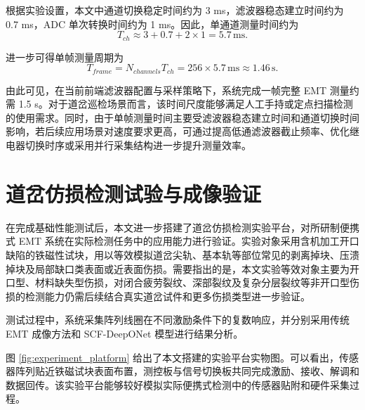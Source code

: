 根据实验设置，本文中通道切换稳定时间约为 3 ms，滤波器稳态建立时间约为 0.7 ms，ADC 单次转换时间约为 1 ms。因此，单通道测量时间约为
\begin{equation}
\label{eq:t_ch_value}
T_{ch}\approx 3+0.7+2\times1=5.7\,\mathrm{ms}.
\end{equation}

进一步可得单帧测量周期为
\begin{equation}
\label{eq:t_frame}
T_{frame}=N_{channels}T_{ch}=256\times5.7\,\mathrm{ms}\approx1.46\,\mathrm{s}.
\end{equation}

由此可见，在当前前端滤波器配置与采样策略下，系统完成一帧完整 EMT 测量约需 1.5 s。对于道岔巡检场景而言，该时间尺度能够满足人工手持或定点扫描检测的使用需求。同时，由于单帧测量时间主要受滤波器稳态建立时间和通道切换时间影响，若后续应用场景对速度要求更高，可通过提高低通滤波器截止频率、优化继电器切换时序或采用并行采集结构进一步提升测量效率。

\section{道岔仿损检测试验与成像验证}

在完成基础性能测试后，本文进一步搭建了道岔仿损检测实验平台，对所研制便携式 EMT 系统在实际检测任务中的应用能力进行验证。实验对象采用含机加工开口缺陷的铁磁性试块，用以等效模拟道岔尖轨、基本轨等部位常见的剥离掉块、压溃掉块及局部缺口类表面或近表面伤损。需要指出的是，本文实验等效对象主要为开口型、材料缺失型伤损，对闭合疲劳裂纹、深部裂纹及复杂分层裂纹等非开口型伤损的检测能力仍需后续结合真实道岔试件和更多伤损类型进一步验证。

测试过程中，系统采集阵列线圈在不同激励条件下的复数响应，并分别采用传统 EMT 成像方法和 SCF-DeepONet 模型进行结果分析。

图 \ref{fig:experiment_platform} 给出了本文搭建的实验平台实物图。可以看出，传感器阵列贴近铁磁试块表面布置，测控板与信号切换板共同完成激励、接收、解调和数据回传。该实验平台能够较好模拟实际便携式检测中的传感器贴附和硬件采集过程。




